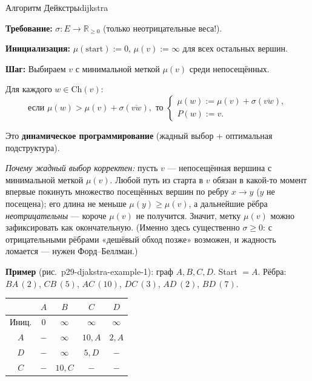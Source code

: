\begin{algo}{Алгоритм Дейкстры}{dijkstra}

\textbf{Требование:} $\sigma\colon E \to \mathbb{R}_{\geq 0}$ (только неотрицательные веса!).

\textbf{Инициализация:}
$\mu(\text{start}) := 0$, \quad $\mu(v) := \infty$ для всех остальных вершин.

\textbf{Шаг:} Выбираем $v$ с минимальной меткой $\mu(v)$ среди непосещённых.

Для каждого $w \in \mathrm{Ch}(v)$:
\[
  \text{если } \mu(w) > \mu(v) + \sigma(\overline{vw}), \text{ то }
  \begin{cases}
    \mu(w) := \mu(v) + \sigma(\overline{vw}), \\
    P(w) := v.
  \end{cases}
\]

Это \textbf{динамическое программирование} (жадный выбор + оптимальная подструктура).

\textit{Почему жадный выбор корректен:} пусть $v$ --- непосещённая
вершина с минимальной меткой $\mu(v)$. Любой путь из старта в $v$
обязан в какой-то момент впервые покинуть множество посещённых вершин по
ребру $x \to y$ ($y$ не посещена); его длина не меньше
$\mu(y) \ge \mu(v)$, а дальнейшие рёбра \emph{неотрицательны} ---
короче $\mu(v)$ не получится. Значит, метку $\mu(v)$ можно зафиксировать
как окончательную. (Именно здесь существенно $\sigma \ge 0$: с
отрицательными рёбрами «дешёвый обход позже» возможен, и жадность
ломается --- нужен Форд--Беллман.)

\textbf{Пример} (рис.~p29-djakstra-example-1): граф $A, B, C, D$. Start $= A$. Рёбра: $BA\,(2)$, $CB\,(5)$, $AC\,(10)$, $DC\,(3)$, $AD\,(2)$, $BD\,(7)$.


\begin{center}
\begin{tabular}{c|c|c|c|c}
       & $A$  & $B$      & $C$      & $D$      \\
\hline
Иниц.  & 0    & $\infty$ & $\infty$ & $\infty$ \\
$A$    & $-$  & $\infty$ & $10, A$  & $2, A$   \\
$D$    & $-$  & $\infty$ & $5, D$   & $-$      \\
$C$    & $-$  & $10, C$  & $-$      & $-$      \\
\end{tabular}
\end{center}


\end{algo}

